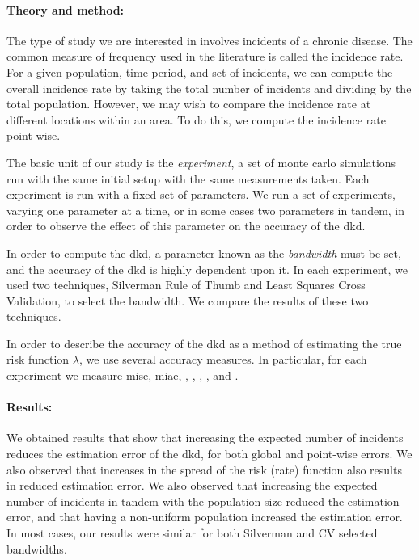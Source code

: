 \begin{onehalfspace}
\paragraph*{Theory and method:}

The type of study we are interested in involves incidents of a chronic disease.
The common measure of frequency used in the literature is called the incidence rate.
For a given population, time period, and set of incidents,
we can compute the overall incidence rate by taking the total number of incidents and dividing by the total population.
However, we may wish to compare the incidence rate at different locations within an area.
To do this, we compute the incidence rate point-wise.

The basic unit of our study is the \textit{experiment},
a set of monte carlo simulations run with the same initial setup with the same measurements taken.
Each experiment is run with a fixed set of parameters.
We run a set of experiments,
varying one parameter at a time, or in some cases two parameters in tandem,
in order to observe the effect of this parameter on the accuracy of the \acrlong{dkd}.

In order to compute the \acrlong{dkd},
a parameter known as the \textit{bandwidth} must be set,
and the accuracy of the \acrlong{dkd} is highly dependent upon it.
In each experiment,
we used two techniques,
Silverman Rule of Thumb and Least Squares Cross Validation,
to select the bandwidth.
We compare the results of these two techniques.

In order to describe the accuracy of the \acrlong{dkd} as a method of estimating the true risk function $\lambda$,
we use several accuracy measures.
In particular,
for each experiment we measure \acrlong{mise},
\acrlong{miae},
,
,
,
,
and .

\paragraph*{Results:}

We obtained results that show that increasing the expected number of incidents
reduces the estimation error of the \acrlong{dkd},
for both global and point-wise errors.
We also observed that increases in the spread of the risk (rate) function also results in reduced estimation error.
We also observed that increasing the expected number of incidents in tandem with the population size reduced the estimation error,
and that having a non-uniform population increased the estimation error.
In most cases,
our results were similar for both Silverman and CV selected bandwidths.


\end{onehalfspace}

